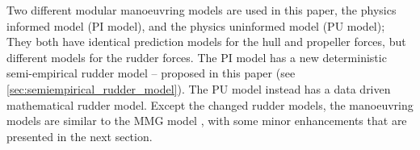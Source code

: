 Two different modular manoeuvring models are used in this paper, the physics informed model (PI model), and the physics uninformed model (PU model); They both have identical prediction models for the hull and propeller forces, but different models for the rudder forces. The PI model has a new deterministic semi-empirical rudder model -- proposed in this paper (see \autoref{sec:semiempirical_rudder_model}). The PU model instead has a data driven mathematical rudder model. 
Except the changed rudder models, the manoeuvring models are similar to the MMG model \citep{yasukawa_introduction_2015}, with some minor enhancements that are presented in the next section.